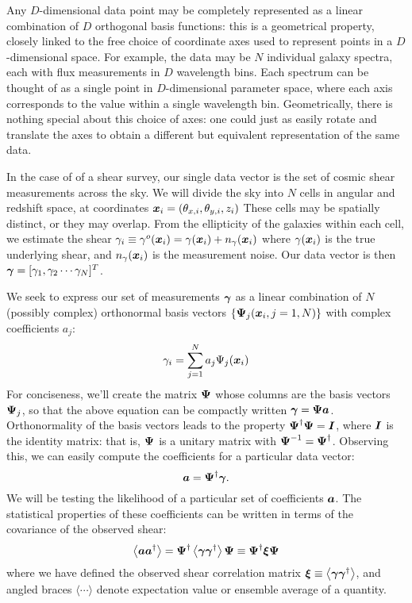 Any $D$-dimensional data point may be completely represented
as a linear combination of $D$ orthogonal basis functions: this is
a geometrical property, closely linked to the free choice of coordinate axes
used to represent points in a $D$-dimensional space.
For example, the data may be $N$ individual galaxy spectra, each with flux
measurements in $D$ wavelength bins.  Each spectrum can be thought of as a
single point in $D$-dimensional parameter space, where each axis corresponds
to the value within a single wavelength bin.  
Geometrically, there is nothing special about
this choice of axes: one could just as easily rotate and translate the axes
to obtain a different but equivalent representation of the same data.

In the case of of a shear survey, our single data vector is the set of
cosmic shear measurements across the sky.  We will divide the sky into $N$
cells in angular and redshift space, at coordinates
$\boldsymbol{x}_i = (\theta_{x,i}, \theta_{y,i}, z_i)$
These cells may be spatially distinct, or they may overlap.
From the ellipticity of the galaxies within each cell, we
estimate the shear
$\gamma_i \equiv \gamma^o(\boldsymbol{x}_i) = 
\gamma(\boldsymbol{x}_i) + n_\gamma(\boldsymbol{x}_i)$
where $\gamma(\boldsymbol{x}_i)$ is the true underlying shear,
and $n_\gamma(\boldsymbol{x}_i)$ is the measurement noise.
Our data vector is then
$\boldsymbol{\gamma} = [\gamma_1, \gamma_2 \cdots \gamma_N]^T$.

We seek to express our set of measurements $\boldsymbol{\gamma}$
as a linear combination of $N$ (possibly complex) 
orthonormal basis vectors
$\{\boldsymbol{\Psi}_j(\boldsymbol{x}_i, j=1,N)\}$ with complex coefficients
$a_j$:
\begin{equation}
  \label{eq:gamma_decomp}
  \gamma_i = \sum_{j=1}^{N} a_j \Psi_j(\boldsymbol{x}_i)
\end{equation}
For conciseness, we'll create the matrix $\boldsymbol{\Psi}$ whose columns are
the basis vectors $\boldsymbol{\Psi}_j$, so that the above equation can be
compactly written $\boldsymbol{\gamma} = \boldsymbol{\Psi}\boldsymbol{a}$.  Orthonormality
of the basis vectors leads to the property
$\boldsymbol{\Psi}^\dagger\boldsymbol{\Psi} = \boldsymbol{I}$, where $\boldsymbol{I}$ is the identity
matrix: that is, $\boldsymbol{\Psi}$ is a unitary matrix with
$\boldsymbol{\Psi}^{-1} = \boldsymbol{\Psi}^\dagger$.  Observing this, we can easily compute
the coefficients for a particular data vector:
\begin{equation}
  \boldsymbol{a} = \boldsymbol{\Psi}^\dagger \boldsymbol{\gamma}.
\end{equation}
We will be testing the likelihood of a particular set of coefficients
$\boldsymbol{a}$.  
The statistical properties of these coefficients can be written in terms of
the covariance of the observed shear:
\begin{equation}
  \label{eq:a_cov}
  \left\langle \boldsymbol{a}\boldsymbol{a}^\dagger \right\rangle 
  =  \boldsymbol{\Psi}^\dagger
  \left\langle \boldsymbol{\gamma}\boldsymbol{\gamma}^\dagger \right\rangle 
  \boldsymbol{\Psi}
  \equiv \boldsymbol{\Psi}^\dagger \boldsymbol{\xi}  \boldsymbol{\Psi}
\end{equation}
where we have defined the observed shear correlation matrix 
$\boldsymbol{\xi} \equiv \left\langle 
\boldsymbol{\gamma}\boldsymbol{\gamma}^\dagger \right\rangle$, and angled braces
$\langle\cdots\rangle$ denote expectation value or ensemble average
of a quantity.

